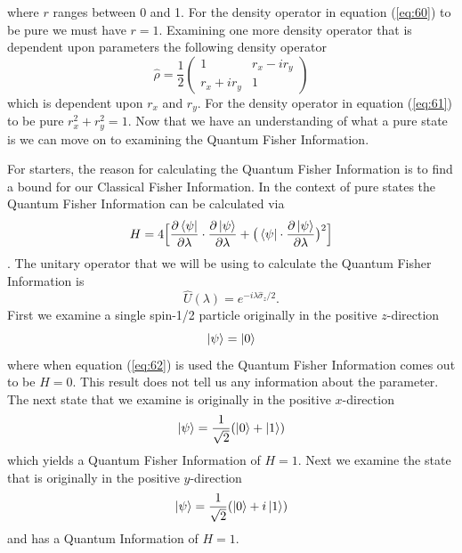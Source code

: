 \documentclass[twocolumn]{article}
\begin{document}
where $r$ ranges between 0 and 1. For the density operator in equation (\ref{eq:60}) to be pure we must have $r=1$. Examining one more density operator that is dependent upon parameters the following density operator 
\begin{equation} \label{eq:61}
\hat{\rho}=\frac{1}{2}
\begin{pmatrix}
1 & r_x-ir_y \\
r_x+ir_y & 1
\end{pmatrix}
\end{equation}
which is dependent upon $r_x$ and $r_y$. For the density operator in equation (\ref{eq:61}) to be pure $r_x^2+r_y^2=1$. Now that we have an understanding of what a pure state is we can move on to examining the Quantum Fisher Information.

For starters, the reason for calculating the Quantum Fisher Information is to find a bound for our Classical Fisher Information. In the context of pure states the Quantum Fisher Information can be calculated via
\begin{equation} \label{eq:62}
H=4\Big[\frac{\partial\bra{\psi}}{\partial\lambda}\cdot\frac{\partial\ket{\psi}}{\partial\lambda}+\big(\bra{\psi}\cdot\frac{\partial\ket{\psi}}{\partial\lambda}\big)^2\Big]
\end{equation}
\cite{D. Collins}. The unitary operator that we will be using to calculate the Quantum Fisher Information is
\begin{equation} \label{eq:63}
\hat{U}(\lambda)=e^{-i\lambda\hat{\sigma}_z/2}.
\end{equation}
First we examine a single spin-1/2 particle originally in the positive $z$-direction
\begin{equation} \label{eq:64}
\ket{\psi}=\ket{0}
\end{equation}
where when equation (\ref{eq:62}) is used the Quantum Fisher Information comes out to be $H=0$. This result does not tell us any information about the parameter. The next state that we examine is originally in the positive $x$-direction
\begin{equation} \label{eq:65}
\ket{\psi}=\frac{1}{\sqrt{2}}(\ket{0}+\ket{1})
\end{equation}
which yields a Quantum Fisher Information of $H=1$. Next we examine the state that is originally in the positive $y$-direction
\begin{equation} \label{eq:66}
\ket{\psi}=\frac{1}{\sqrt{2}}(\ket{0}+i\ket{1})
\end{equation}
and has a Quantum Information of $H=1$.
\end{document}
